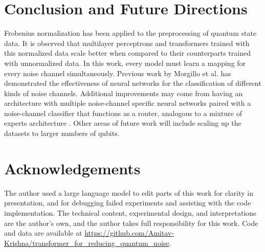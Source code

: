 \documentclass{ieeeqccl}
\begin{document}
\section{Conclusion and Future Directions}
\label{sec:org3341aa7}
Frobenius normalization has been applied to the preprocessing of quantum state data.  It is observed that multilayer perceptrons and transformers trained with this normalized data scale better when compared to their counterparts trained with unnormalized data.  In this work, every model must learn a mapping for every noise channel simultaneously.  Previous work by Morgillo et al. \autocite{Morgillo_2024} has demonstrated the effectiveness of neural networks for the classification of different kinds of noise channels.  Additional improvements may come from having an architecture with multiple noise-channel specific neural networks paired with a noise-channel classifier that functions as a router, analogous to a mixture of experts architecture \autocite{jacobs1991adaptive}.  Other areas of future work will include scaling up the datasets to larger numbers of qubits. 


\section{Acknowledgements}
\label{sec:org8710864}
The author used a large language model to edit parts of this work for clarity in presentation, and for debugging failed experiments and assisting with the code implementation.  The technical content, experimental design, and interpretations are the author's own, and the author takes full responsibility for this work.  Code and data are available at \url{https://github.com/Amitav-Krishna/transformer_for_reducing_quantum_noise}.
\printbibliography
\end{document}
